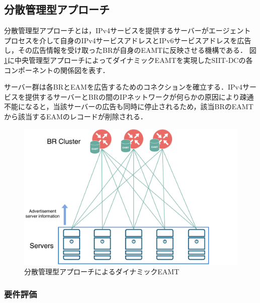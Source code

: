 \subsection{分散管理型アプローチ}
分散管理型アプローチとは，IPv4サービスを提供するサーバーがエージェントプロセスを介して自身のIPv4サービスアドレスとIPv6サービスアドレスを広告し，その広告情報を受け取ったBRが自身のEAMTに反映させる機構である．
図\ref{fig:approach_distributed_model}に中央管理型アプローチによってダイナミックEAMTを実現したSIIT-DCの各コンポーネントの関係図を表す．

サーバー群は各BRとEAMを広告するためのコネクションを確立する．IPv4サービスを提供するサーバーとBRの間のIPネットワークが何らかの原因により疎通不能になると，当該サーバーの広告も同時に停止されるため，該当BRのEAMTから該当するEAMのレコードが削除される．



\begin{figure}[h]
    \begin{center}
      \includegraphics[width=12cm,pagebox=cropbox,clip]{img/approach_distributed_model.pdf}
    \end{center}
    \caption{分散管理型アプローチによるダイナミックEAMT}
    \label{fig:approach_distributed_model}
\end{figure}

\subsubsection{要件評価}

